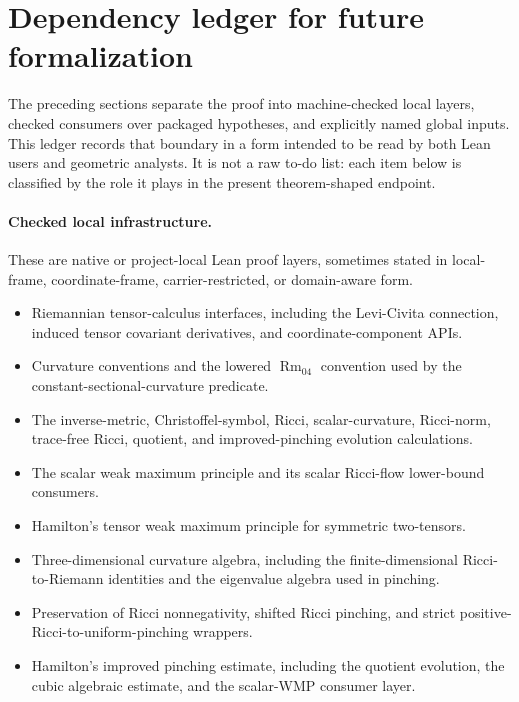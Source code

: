 \documentclass[11pt]{article}
\theoremstyle{plain}
\theoremstyle{definition}
\theoremstyle{remark}
\newcommand{\Rm}{\operatorname{Rm}}
\begin{document}
\section{Dependency ledger for future formalization}

The preceding sections separate the proof into machine-checked local layers,
checked consumers over packaged hypotheses, and explicitly named global inputs.
This ledger records that boundary in a form intended to be read by both Lean
users and geometric analysts.  It is not a raw to-do list: each item below is
classified by the role it plays in the present theorem-shaped endpoint.

\paragraph{Checked local infrastructure.}
These are native or project-local Lean proof layers, sometimes stated in
local-frame, coordinate-frame, carrier-restricted, or domain-aware form.
\begin{itemize}[leftmargin=2em]
  \item Riemannian tensor-calculus interfaces, including the Levi-Civita
  connection, induced tensor covariant derivatives, and coordinate-component
  APIs.
  \item Curvature conventions and the lowered \(\Rm_{04}\) convention used by
  the constant-sectional-curvature predicate.
  \item The inverse-metric, Christoffel-symbol, Ricci, scalar-curvature,
  Ricci-norm, trace-free Ricci, quotient, and improved-pinching evolution
  calculations.
  \item The scalar weak maximum principle and its scalar Ricci-flow lower-bound
  consumers.
  \item Hamilton's tensor weak maximum principle for symmetric two-tensors.
  \item Three-dimensional curvature algebra, including the finite-dimensional
  Ricci-to-Riemann identities and the eigenvalue algebra used in pinching.
  \item Preservation of Ricci nonnegativity, shifted Ricci pinching, and strict
  positive-Ricci-to-uniform-pinching wrappers.
  \item Hamilton's improved pinching estimate, including the quotient
  evolution, the cubic algebraic estimate, and the scalar-WMP consumer layer.
\end{itemize}
\end{document}
